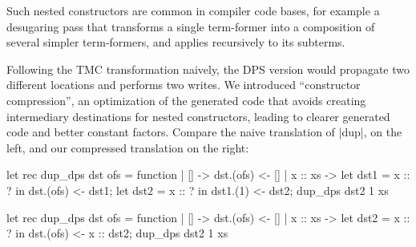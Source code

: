 Such nested constructors are common in compiler code bases, for
example a desugaring pass that transforms a single term-former into
a composition of several simpler term-formers, and applies recursively to
its subterms.

Following the TMC transformation naively, the DPS version would propagate two different locations and performs two writes. We introduced ``constructor compression'', an optimization of the generated code that avoids creating intermediary destinations for nested constructors, leading to clearer generated code and better constant factors. Compare the naive translation of \ocaml|dup|, on the left, and our compressed translation on the right:

\begin{minipage}{0.5\linewidth}
\begin{Ocaml}
let rec dup_dps dst ofs = function
| [] -> dst.(ofs) <- []
| x :: xs ->
  let dst1 = x :: ? in
  dst.(ofs) <- dst1;
  let dst2 = x :: ? in
  dst1.(1) <- dst2;
  dup_dps dst2 1 xs
\end{Ocaml}
\end{minipage}
\hfill
\begin{minipage}{0.5\linewidth}
\begin{Ocaml}
let rec dup_dps dst ofs = function
| [] -> dst.(ofs) <- []
| x :: xs ->
  let dst2 = x :: ? in
  dst.(ofs) <- x :: dst2;
  dup_dps dst2 1 xs
\end{Ocaml}
\end{minipage}

